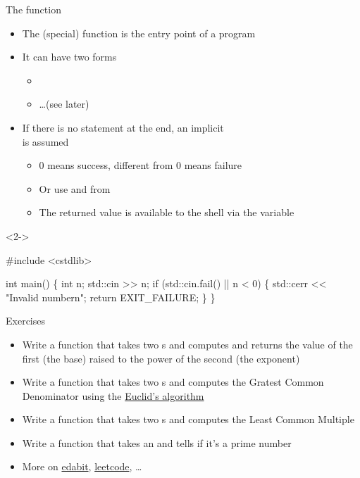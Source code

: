 \begin{frame}[fragile]{The  function}
  \begin{itemize}
  \item The  (special) function is the entry point of a program
  \item It can have two forms
    \begin{itemize}
    \item {}
    \item \ldots (see later)
    \end{itemize}
  \item<2-> If there is no  statement at the end, an implicit\\
     is assumed
    \begin{itemize}
    \item $0$ means success, different from $0$ means failure
    \item Or use  and  from 
    \item The returned value is available to the shell via the 
      variable
    \end{itemize}
  \end{itemize}

  \begin{codeblock}<2->{
#include <cstdlib>

int main() \{
  int n;
  std::cin >> n;
  if (std::cin.fail() || n < 0) \{
    std::cerr << "Invalid number\bslash{}n";
    return EXIT_FAILURE;
  \}
  \ddd
\}}\end{codeblock}

\end{frame}

\begin{frame}{Exercises}
  \begin{itemize}
  \item Write a function  that takes two s and computes and
    returns the value of the first (the base) raised to the power of the second
    (the exponent)
  \item Write a function  that takes two s and computes the
    Gratest Common Denominator using the
    \href{https://en.wikipedia.org/wiki/Euclidean_algorithm}{Euclid's algorithm}
  \item Write a function  that takes two s and computes the
    Least Common Multiple
  \item Write a function  that takes an  and tells if
    it's a prime number
  \item More on \href{https://edabit.com/}{edabit}, \href{https://leetcode.com/}{leetcode}, \ldots
  \end{itemize}

\end{frame}

